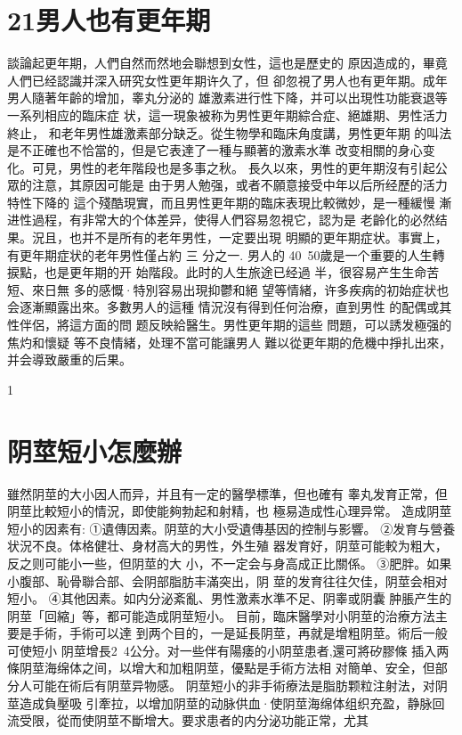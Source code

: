 \documentclass[12pt,UTF8]{ctexbook}
\begin{document}
\section{21男人也有更年期}
談論起更年期，人們自然而然地会聯想到女性，這也是歷史的
原因造成的，畢竟人們已经認識并深入研究女性更年期许久了，但
卻忽視了男人也有更年期。成年男人隨著年齡的增加，睾丸分泌的
雄激素进行性下降，并可以出現性功能衰退等一系列相应的臨床症
状，這一現象被称为男性更年期綜合症、絕雄期、男性活力終止，
和老年男性雄激素部分缺乏。從生物學和臨床角度講，男性更年期
的叫法是不正確也不恰當的，但是它表達了一種与顯著的激素水準
改变相關的身心变化。可見，男性的老年階段也是多事之秋。
長久以來，男性的更年期沒有引起公眾的注意，其原因可能是
由于男人勉强，或者不願意接受中年以后所经歷的活力特性下降的
這个殘酷現實，而且男性更年期的臨床表現比較微妙，是一種緩慢
漸进性過程，有非常大的个体差异，使得人們容易忽視它，認为是
老齡化的必然结果。況且，也并不是所有的老年男性，一定要出現
明顯的更年期症状。事實上，有更年期症状的老年男性僅占約 三
分之一.
男人的 40~50歲是一个重要的人生轉捩點，也是更年期的开
始階段。此时的人生旅途已经過
半，很容易产生生命苦短、來日無
多的感慨·特別容易出現抑鬱和絕
望等情緒，许多疾病的初始症状也
会逐漸顯露出來。多數男人的這種
情況沒有得到任何治療，直到男性
的配偶或其性伴侶，將這方面的問
题反映給醫生。男性更年期的這些
問題，可以誘发極强的焦灼和懷疑
等不良情緒，处理不當可能讓男人
難以從更年期的危機中掙扎出來，
并会導致嚴重的后果。

1
\section{阴莖短小怎麼辦}
雖然阴莖的大小因人而异，并且有一定的醫學標準，但也確有
睾丸发育正常，但阴莖比較短小的情況，即使能夠勃起和射精，也
極易造成性心理异常。
造成阴莖短小的因素有:
①遺傳因素。阴莖的大小受遺傳基因的控制与影響。
②发育与營養状況不良。体格健壮、身材高大的男性，外生殖
器发育好，阴莖可能較为粗大，反之则可能小一些，但阴莖的大
小，不一定会与身高成正比關係。
③肥胖。如果小腹部、恥骨聯合部、会阴部脂肪丰滿突出，阴
莖的发育往往欠佳，阴莖会相对短小。
④其他因素。如内分泌紊亂、男性激素水準不足、阴睾或阴囊
肿脹产生的阴莖「回縮」等，都可能造成阴莖短小。
目前，臨床醫學对小阴莖的治療方法主要是手術，手術可以達
到两个目的，一是延長阴莖，再就是增粗阴莖。術后一般可使短小
阴莖增長2~4公分。对一些伴有陽痿的小阴莖患者,還可將矽膠條
插入两條阴莖海绵体之间，以增大和加粗阴莖，優點是手術方法相
对簡单、安全，但部分人可能在術后有阴莖异物感。
阴莖短小的非手術療法是脂肪颗粒注射法，对阴莖造成負壓吸
引牽拉，以增加阴莖的动脉供血·使阴莖海绵体组织充盈，静脉回
流受限，從而使阴莖不斷增大。要求患者的内分泌功能正常，尤其
\end{document}
